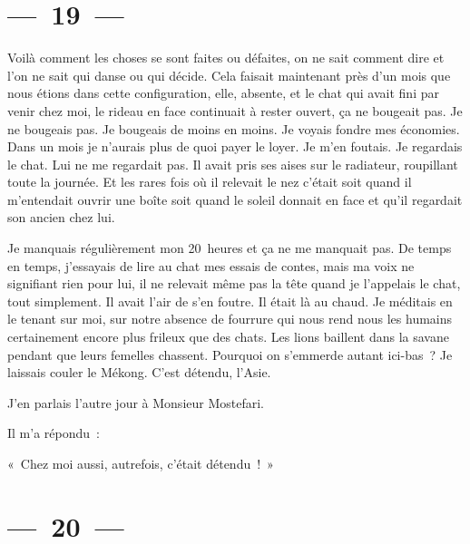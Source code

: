 \documentclass[twoside]{book} %
\begin{document}
\section[{— 19 —}]{— 19 —}
\renewcommand{\leftmark}{— 19 —}

\noindent Voilà comment les choses se sont faites ou défaites, on ne sait comment dire et l’on ne sait qui danse ou qui décide. Cela faisait maintenant près d’un mois que nous étions dans cette configuration, elle, absente, et le chat qui avait fini par venir chez moi, le rideau en face continuait à rester ouvert, ça ne bougeait pas. Je ne bougeais pas. Je bougeais de moins en moins. Je voyais fondre mes économies. Dans un mois je n’aurais plus de quoi payer le loyer. Je m’en foutais. Je regardais le chat. Lui ne me regardait pas. Il avait pris ses aises sur le radiateur, roupillant toute la journée. Et les rares fois où il relevait le nez c’était soit quand il m’entendait ouvrir une boîte soit quand le soleil donnait en face et qu’il regardait son ancien chez lui.\par
Je manquais régulièrement mon 20 heures et ça ne me manquait pas. De temps en temps, j’essayais de lire au chat mes essais de contes, mais ma voix ne signifiant rien pour lui, il ne relevait même pas la tête quand je l’appelais le chat, tout simplement. Il avait l’air de s’en foutre. Il était là au chaud. Je méditais en le tenant sur moi, sur notre absence de fourrure qui nous rend nous les humains certainement encore plus frileux que des chats. Les lions baillent dans la savane pendant que leurs femelles chassent. Pourquoi on s’emmerde autant ici-bas ? Je laissais couler le Mékong. C’est détendu, l’Asie.\par
J’en parlais l’autre jour à Monsieur Mostefari.\par
Il m’a répondu :\par
« Chez moi aussi, autrefois, c’était détendu ! »

\section[{— 20 —}]{— 20 —}
\renewcommand{\leftmark}{— 20 —}
\end{document}
